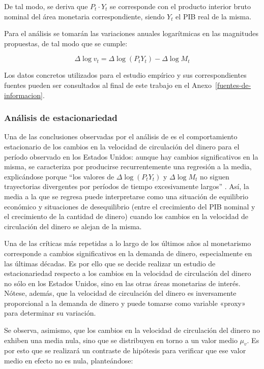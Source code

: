\documentclass[titlepage, 12pt]{article}
\begin{document}
De tal modo, se deriva que $P_t\cdot Y_t$ se corresponde con el producto interior bruto nominal del área monetaria correspondiente, siendo $Y_t$ el PIB real de la misma.

Para el análisis se tomarán las variaciones anuales logarítmicas en las magnitudes propuestas, de tal modo que se cumple:

\begin{equation}
    \Delta\log{v_t}=\Delta\log{\left(P_tY_t\right)}-\Delta\log{M_t}
\end{equation}

Los datos concretos utilizados para el estudio empírico y sus correspondientes fuentes pueden ser consultados al final de este trabajo en el Anexo~\ref{fuentes-de-informacion}.

\subsubsection{Análisis de estacionariedad}

Una de las conclusiones observadas por el análisis de \cite{castaneda2023} es el comportamiento estacionario de los cambios en la velocidad de circulación del dinero para el período observado en los Estados Unidos: aunque hay cambios significativos en la misma, se caracteriza por producirse recurrentemente una regresión a la media, explicándose porque “los valores de $\Delta\log{\left(P_tY_t\right)}$ y $\Delta\log{M_t}$ no siguen trayectorias divergentes por períodos de tiempo excesivamente largos” \autocite[8]{castaneda2023}. Así, la media a la que se regresa puede interpretarse como una situación de equilibrio económico y situaciones de desequilibrio (entre el crecimiento del PIB nominal y el crecimiento de la cantidad de dinero) cuando los cambios en la velocidad de circulación del dinero se alejan de la misma.

Una de las críticas más repetidas a lo largo de los últimos años al monetarismo corresponde a cambios significativos en la demanda de dinero, especialmente en las últimas décadas. Es por ello que se decide realizar un estudio de estacionariedad respecto a los cambios en la velocidad de circulación del dinero no sólo en los Estados Unidos, sino en las otras áreas monetarias de interés. Nótese, además, que la velocidad de circulación del dinero es inversamente proporcional a la demanda de dinero y puede tomarse como variable «proxy» para determinar su variación.

Se observa, asimismo, que los cambios en la velocidad de circulación del dinero no exhiben una media nula, sino que se distribuyen en torno a un valor medio $\mu_v$. Es por esto que se realizará un contraste de hipótesis para verificar que ese valor medio en efecto no es nula, planteándose:
\end{document}
